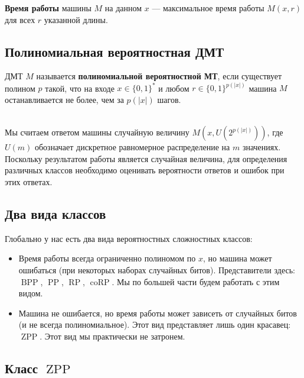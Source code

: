\documentclass[11pt]{article}
\DeclareMathOperator{\BPP}{BPP}
\DeclareMathOperator{\PP}{PP}
\DeclareMathOperator{\RP}{RP}
\DeclareMathOperator{\coRP}{coRP}
\DeclareMathOperator{\ZPP}{ZPP}
\begin{document}
\begin{definition}
    \textbf{Время работы} машины $M$ на данном $x$ --- максимальное время работы $M(x, r)$ для всех $r$ указанной длины.
\end{definition}

\subsection{Полиномиальная вероятностная ДМТ}

\begin{definition}
    ДМТ $M$ называется \textbf{полиномиальной вероятностной МТ}, если существует полином $p$ такой, что на входе $x \in \{0, 1\}^{\ast}$ и любом $r \in \{0, 1\}^{p(\left\lvert x \right\rvert)}$ машина $M$ останавливается не более, чем за $p(\left\lvert x \right\rvert)$ шагов.
\end{definition} \leavevmode
\\
Мы считаем ответом машины случайную величину $M(x, U(2^{p(\left\lvert x \right\rvert)}))$, где $U(m)$ обозначает дискретное равномерное распределение на $m$ значениях. \\
Поскольку результатом работы является случайная величина, для определения различных классов необходимо оценивать вероятности ответов и ошибок при этих ответах.

\subsection{Два вида классов}

Глобально у нас есть два вида вероятностных сложностных классов:

\begin{itemize}
    \item Время работы всегда ограниченно полиномом по $x$, но машина может ошибаться (при некоторых наборах случайных битов). Представители здесь: $\BPP$, $\PP$, $\RP$, $\coRP$. Мы по большей части будем работать с этим видом.
    \item Машина не ошибается, но время работы может зависеть от случайных битов (и не всегда полиномиальное). Этот вид представляет лишь один красавец: $\ZPP$. Этот вид мы практически не затронем.
\end{itemize}

\subsection{Класс $\ZPP$}
\end{document}
